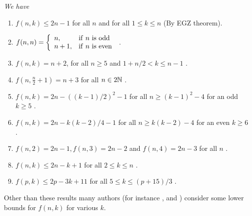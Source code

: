\documentclass[fleqn]{mat01}
\begin{document}
\vspace{.2pc}
\begin{theorr}{\it We have
\begin{enumerate}
\renewcommand\labelenumi{\rm \arabic{enumi}.}
\leftskip -.15pc
\item $f(n,k) \leq 2n-1$ for all $n$ and for all $1\leq k\leq n$ {\rm
(}By EGZ theorem{\rm )}.\vspace{.3pc}

\item $f(n,n) =\left\{ \begin{array}{ll} n, &{\rm if } \ n \ {\rm
is~odd}\\ n+1, &{\rm if } \ n \ {\rm is~even } \end{array}\right.$
{\rm \cite{ggp}}.\vspace{.3pc}

\item $f(n,k) = n+2${\rm ,} for all $n\geq 5$ and $1+n/2 < k \leq n-1$
{\rm \cite{br,ggp}}.\vspace{.3pc}

\item $f\left(n, \frac{n}2+1 \right) = n+3$ for all $n\in 2{\Bbb N}$
{\rm \cite{gghhlp}}.\vspace{.3pc}

\item $f(n,k) = 2n -((k-1)/2)^2-1$ for all $n\geq (k-1)^2-4$ for an odd
$k\geq 5$ {\rm \cite{wan}}.\vspace{.3pc}

\item $f(n,k) = 2n - k(k-2)/4 -1$ for all $n \geq k(k-2)-4$ for an even
$k\geq 6$ {\rm \cite{wan}}.\vspace{.3pc}

\item $f(n,2) = 2n-1, f(n,3) = 2n-2$ and $f(n,4) = 2n -3$ for all $n$
{\rm \cite{bl}}.\vspace{.3pc}

\item $f(n,k) \leq 2n -k+1$ for all $2\leq k\leq n$ {\rm \cite{ham}}.\vspace{.3pc}

\item $f(p,k) \leq 2p -3k+11$ for all $5\leq k \leq (p+15)/3$
{\rm \cite{at}}.
\end{enumerate}}
\end{theorr}

Other than these results many authors (for instance \cite{gg},
\cite{bl} and \cite{biol}) consider some lower bounds for $f(n,k)$ for
various $k$.
\end{document}
